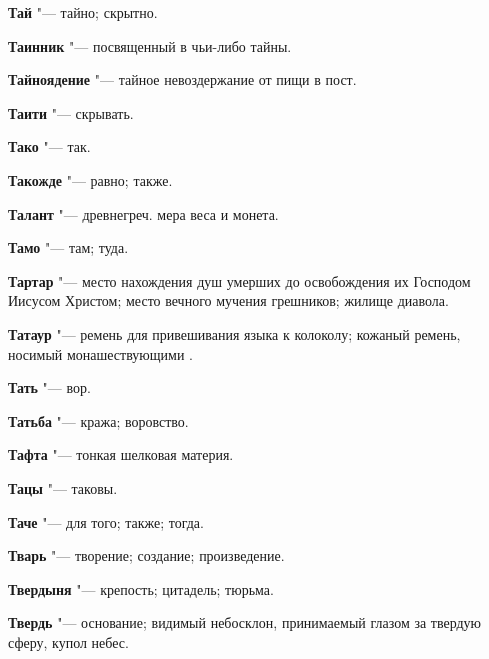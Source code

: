 \begin{mymulticols}{2}
\noindent\textbf{Тай} "--- тайно; скрытно. 




\noindent\textbf{Таинник} "--- посвященный в чьи-либо тайны. 




\noindent\textbf{Тайноядение} "--- тайное невоздержание от пищи в пост. 




\noindent\textbf{Таити} "--- скрывать. 




\noindent\textbf{Тако} "--- так. 




\noindent\textbf{Такожде} "--- равно; также. 




\noindent\textbf{Талант} "--- древнегреч. мера веса и монета. 




\noindent\textbf{Тамо} "--- там; туда. 




\noindent\textbf{Тартар} "--- место нахождения душ умерших до освобождения их Господом Иисусом Христом; место вечного мучения грешников; жилище диавола. 




\noindent\textbf{Татаур} "--- ремень для привешивания языка к колоколу; кожаный ремень, носимый монашествующими . 




\noindent\textbf{Тать} "--- вор. 




\noindent\textbf{Татьба} "--- кража; воровство. 




\noindent\textbf{Тафта} "--- тонкая шелковая материя. 




\noindent\textbf{Тацы} "--- таковы. 




\noindent\textbf{Таче} "--- для того; также; тогда. 




\noindent\textbf{Тварь} "--- творение; создание; произведение. 




\noindent\textbf{Твердыня} "--- крепость; цитадель; тюрьма. 




\noindent\textbf{Твердь} "--- основание; видимый небосклон, принимаемый глазом за твердую сферу, купол небес. 





\end{mymulticols}
